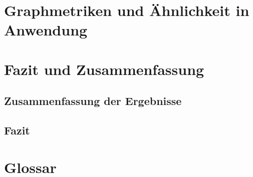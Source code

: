\documentclass[a4paper,12pt,ngerman,chapterprefix=false,listof=totoc,bibliography=totoc]{scrreprt}
\begin{document}
\chapter{Graphmetriken und Ähnlichkeit in Anwendung}

\chapter{Fazit und Zusammenfassung}

\section{Zusammenfassung der Ergebnisse}

\section{Fazit}

\chapter*{Glossar}
{
}
\nocite{*}
\printbibliography
\end{document}
